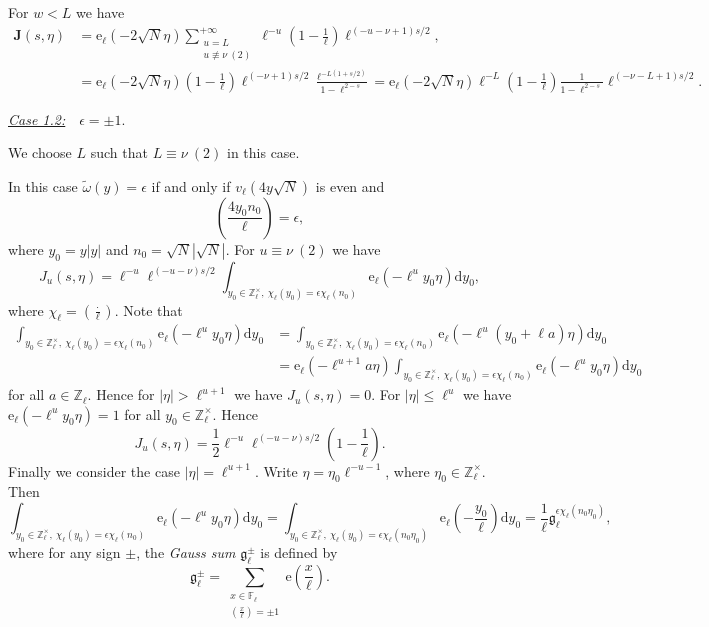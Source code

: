 \documentclass[10pt,oneside,reqno]{amsart}
\makeatletter
\newcommand\rmd{\mathrm{d}}
\newcommand\rme{\mathrm{e}}
\newcommand\bJ{\mathbf{J}}
\newcommand\FF{\mathbb{F}}
\newcommand\ZZ{\mathbb{Z}}
\newcommand\mf[1]{\mathfrak{#1}}
\renewcommand\leq{\leqslant}
\newcommand\legendresymbol[2]{\genfrac{(}{)}{}{}{#1}{#2}}
\theoremstyle{THEOREM}
\theoremstyle{DEFINITION}
\theoremstyle{EXERCISE}
\numberwithin{equation}{section}
\renewenvironment{proof}[1][\proofname]{\par
  \vspace{-6pt}
  \pushQED{\qed}
  \normalfont \topsep6\p@\@plus6\p@\relax
  \trivlist
  \item[\hskip\labelsep\rmfamily\bfseries
    #1\@addpunct{:}]\ignorespaces
}{
  \popQED\endtrivlist\@endpefalse
  \vspace{-6pt}
}
\makeatother
\begin{document}
\begin{proof}
For $w<L$ we have
\begin{align*}
   \bJ(s,\eta) & =\rme_\ell(-2\sqrt{N}\eta)\sum_{\substack{u=L\\u\not\equiv \nu \ (2)}}^{+\infty}\ell^{-u}\left(1-\frac{1}{\ell}\right)\ell^{(-u-\nu+1)s/2}, \\
     & =\rme_\ell(-2\sqrt{N}\eta)\left(1-\frac{1}{\ell}\right)\ell^{(-\nu+1)s/2}\frac{\ell^{-L(1+s/2)}}{1-\ell^{2-s}} =\rme_\ell(-2\sqrt{N}\eta)\ell^{-L}\left(1-\frac{1}{\ell}\right)\frac{1}{1-\ell^{2-s}}\ell^{(-\nu-L+1)s/2}.
\end{align*}

\underline{\emph{Case 1.2:}}\ \ $\epsilon=\pm 1$. 

We choose $L$ such that $L\equiv \nu\ (2)$ in this case.

In this case $\widetilde{\omega}(y)=\epsilon$ if and only if $v_\ell(4y\sqrt{N})$ is even and 
\[
\legendresymbol{4y_0n_0}{\ell}=\epsilon,
\]
where $y_0=y|y|$ and $n_0=\sqrt{N}|\sqrt{N}|$.
For $u\equiv \nu\ (2)$ we have
\[
J_u(s,\eta)=\ell^{-u}\ell^{(-u-\nu)s/2}\int_{y_0\in\ZZ_\ell^\times,\ \chi_\ell(y_0)=\epsilon\chi_\ell(n_0)} \rme_\ell(-\ell^uy_0\eta)\rmd y_0,
\]
where $\chi_\ell=\legendresymbol{\cdot}{\ell}$. Note that
\begin{align*}
   \int_{y_0\in\ZZ_\ell^\times,\ \chi_\ell(y_0)=\epsilon\chi_\ell(n_0)} \rme_\ell(-\ell^uy_0\eta)\rmd y_0 & =\int_{y_0\in\ZZ_\ell^\times,\ \chi_\ell(y_0)=\epsilon\chi_\ell(n_0)} \rme_\ell(-\ell^u(y_0+\ell a)\eta)\rmd y_0  \\
     & =\rme_\ell(-\ell^{u+1}a\eta)\int_{y_0\in\ZZ_\ell^\times,\ \chi_\ell(y_0)=\epsilon\chi_\ell(n_0)} \rme_\ell(-\ell^uy_0\eta)\rmd y_0
\end{align*}
for all $a\in \ZZ_\ell$. Hence for $|\eta|>\ell^{u+1}$ we have $J_u(s,\eta)=0$. For $|\eta| \leq \ell^u$ we have $\rme_\ell(-\ell^uy_0\eta)=1$ for all $y_0\in \ZZ_\ell^\times$. Hence
\[
J_u(s,\eta)=\frac{1}{2}\ell^{-u}\ell^{(-u-\nu)s/2}\left(1-\frac{1}{\ell}\right).
\]
Finally we consider the case $|\eta|=\ell^{u+1}$. Write $\eta=\eta_0\ell^{-u-1}$, where $\eta_0\in \ZZ_\ell^\times$. Then
\[
\int_{y_0\in\ZZ_\ell^\times,\ \chi_\ell(y_0)=\epsilon\chi_\ell(n_0)} \rme_\ell(-\ell^uy_0\eta)\rmd y_0 =\int_{y_0\in\ZZ_\ell^\times,\ \chi_\ell(y_0)=\epsilon\chi_\ell(n_0\eta_0)}\rme_\ell\left(-\frac{y_0}{\ell}\right)\rmd y_0=\frac{1}{\ell}\mf{g}_\ell^{\epsilon\chi_\ell(n_0\eta_0)},
\]
where for any sign $\pm$, the \emph{Gauss sum} $\mf{g}_\ell^\pm$ is defined by
\[
\mf{g}_\ell^\pm=\sum_{\substack{x\in \FF_\ell\\\legendresymbol{x}{\ell}=\pm 1}}\rme\legendresymbol{x}{\ell}.
\]



\end{proof}
\end{document}
